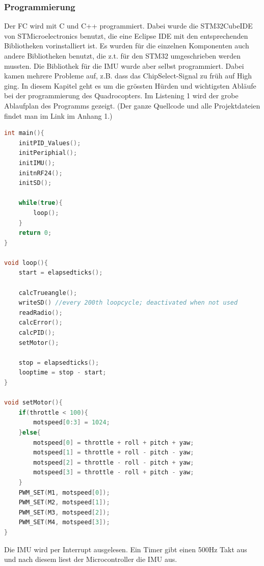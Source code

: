 \documentclass[12pt,a4paper, ngerman]{article}
\begin{document}
\subsubsection{Programmierung}
Der FC wird mit C und C++ programmiert. Dabei wurde die STM32CubeIDE von STMicroelectronics benutzt, die eine Eclipse IDE mit den entsprechenden Bibliotheken vorinstalliert ist. Es wurden für die einzelnen Komponenten auch andere Bibliotheken benutzt, die z.t. für den STM32 umgeschrieben werden mussten. Die Bibliothek für die IMU wurde aber selbst programmiert. Dabei kamen mehrere Probleme auf, z.B. dass das ChipSelect-Signal zu früh auf High ging. In diesem Kapitel geht es um die grössten Hürden und wichtigsten Abläufe bei der programmierung des Quadrocopters. Im Listening 1 wird der grobe Ablaufplan des Programms gezeigt. (Der ganze Quellcode und alle Projektdateien findet man im Link im Anhang 1.)

\begin{lstlisting}[language=C++,caption=Programmablauf Pseudocode]
int main(){
	initPID_Values();
	initPeriphial();
	initIMU();
	initnRF24();
	initSD();
	
	while(true){
		loop();
	}
	return 0;
}

void loop(){
	start = elapsedticks();
	
	calcTrueangle();
	writeSD() //every 200th loopcycle; deactivated when not used
	readRadio();
	calcError();
	calcPID();
	setMotor();
	
	stop = elapsedticks();
	looptime = stop - start;
}

void setMotor(){
	if(throttle < 100){
		motspeed[0:3] = 1024;	
	}else{
		motspeed[0] = throttle + roll + pitch + yaw; 
		motspeed[1]	= throttle + roll - pitch - yaw;
		motspeed[2]	= throttle - roll - pitch + yaw;
		motspeed[3]	= throttle - roll + pitch - yaw;
	}
	PWM_SET(M1, motspeed[0]);
	PWM_SET(M2, motspeed[1]);
	PWM_SET(M3, motspeed[2]);
	PWM_SET(M4, motspeed[3]);
}
\end{lstlisting}
\noindent
Die IMU wird per Interrupt ausgelesen. Ein Timer gibt einen 500Hz Takt aus und nach diesem liest der Microcontroller die IMU aus.
\newpage
\end{document}
